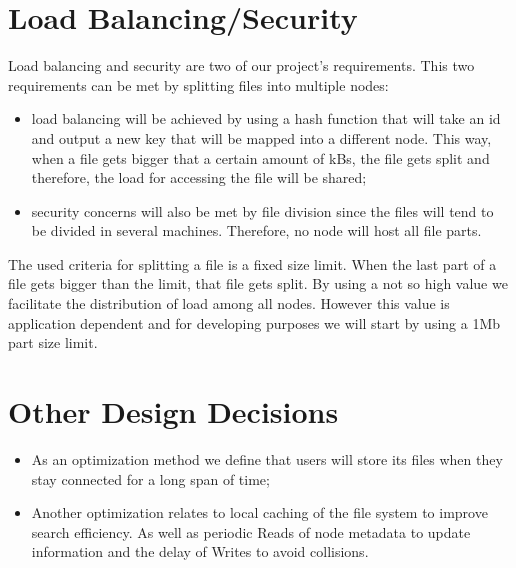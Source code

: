 \documentclass[times,9pt,article]{llncs}
\begin{document}
\section{Load Balancing/Security}

Load balancing and security are two of our project's requirements. This two 
requirements can be met by splitting files into multiple nodes:
\begin{itemize}
\item load balancing will be achieved by using a hash function that will take
an id and output a new key that will be mapped into a different node. This way,
when a file gets bigger that a certain amount of kBs, the file gets split and
therefore, the load for accessing the file will be shared;
\item security concerns will also be met by file division since the files will
tend to be divided in several machines. Therefore, no node will host all file
parts.
\end{itemize}
The used criteria for splitting a file is a fixed size limit. When the last part
of a file gets bigger than the limit, that file gets split. By using a not so high
value we facilitate the distribution of load among all nodes. However this value
is application dependent and for developing purposes we will start by using a
1Mb part size limit.   

\section{Other Design Decisions}
\begin{itemize}
\item As an optimization method we define that users will store its files when they stay connected for a long span of time;
\item Another optimization relates to local caching of the file system to improve search efficiency. As well as periodic Reads of node metadata to update information and the delay of Writes to avoid collisions.
\end{itemize}
\end{document}
